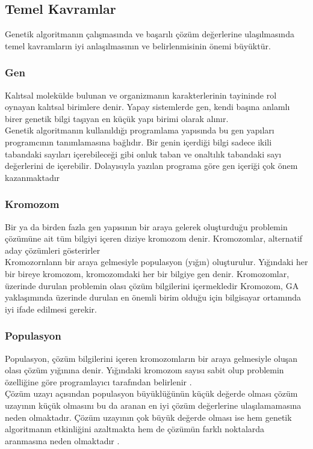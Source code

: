 \documentclass[12pt, a4paper]{article}
\begin{document}
\begin{flushleft}
	\subsection{Temel Kavramlar}\cite{kuccuk2021hemcsire}
	Genetik algoritmanın çalışmasında ve başarılı çözüm değerlerine 
	ulaşılmasında temel kavramların iyi anlaşılmasının ve belirlenmisinin önemi 
	büyüktür.
	\subsubsection{ Gen}
	Kalıtsal molekülde bulunan ve organizmanın karakterlerinin tayininde rol 
	oynayan kalıtsal birimlere denir. Yapay sistemlerde gen, kendi başına anlamlı birer 
	genetik bilgi taşıyan en küçük yapı birimi olarak alınır.\\[5pt]
	Genetik algoritmanın kullanıldığı programlama yapısında bu gen yapıları 
	programcının tanımlamasına bağlıdır. Bir genin içerdiği bilgi sadece ikili tabandaki 
	sayıları içerebileceği gibi onluk taban ve onaltılık tabandaki sayı değerlerini de 
	içerebilir. Dolayısıyla yazılan programa göre gen içeriği çok önem kazanmaktadır
	\subsubsection{  Kromozom}
	Bir ya da birden fazla gen yapısının bir araya gelerek oluşturduğu problemin 
	çözümüne ait tüm bilgiyi içeren diziye kromozom denir. Kromozomlar, alternatif 
	aday çözümleri gösterirler \\[5pt]
	Kromozornlann bir araya gelmesiyle populasyon (yığın) oluşturulur. 
	Yığındaki her bir bireye kromozom, kromozomdaki her bir bilgiye gen denir. 
	Kromozomlar, üzerinde durulan problemin olası çözüm bilgilerini içermekledir 
	Kromozom, GA yaklaşımında üzerinde durulan en önemli birim 
	olduğu için bilgisayar ortamında iyi ifade edilmesi gerekir.
	
	\subsubsection{  Populasyon}
	
	Populasyon, çözüm bilgilerini içeren kromozomların bir araya gelmesiyle 
	oluşan olası çözüm yığınına denir. Yığındaki kromozoın sayısı sabit olup problemin 
	özelliğine göre programlayıcı tarafından belirlenir .\\[5pt]
	Çözüm uzayı açısından populasyon büyüklüğünün küçük değerde olması 
	çözüm uzayının küçük olmasını bu da aranan en iyi çözüm değerlerine 
	ulaşılamamasına neden olmaktadır. Çözüm uzayının çok büyük değerde olması ise 
	hem genetik algoritmanın etkinliğini azaltmakta hem de çözümün farklı noktalarda 
	aranmasına neden olmaktadır .\\[5pt]
	

\end{flushleft}
\end{document}
